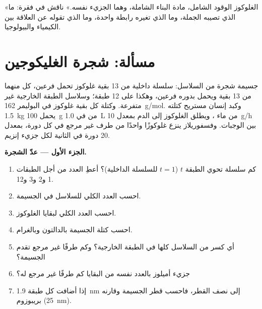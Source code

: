 \begin{exercise}[$\star\star\star$]\label{exo:b1:carbohydrates:12}
«الغلوكوز الوقود الشامل،  مادة البناء الشاملة، وهما
الجزيء نفسه.» ناقش في فقرة: ما الذي تصيبه الجملة، وما الذي تغيره
رابطة واحدة، وما الذي تقوله عن العلاقة بين الكيمياء والبيولوجيا.
\end{exercise}

\section{مسألة: شجرة الغليكوجين}

\begin{problem}
\label{pb:b1:carbohydrates:1}
جسيمة  شجرة من السلاسل: سلسلة داخلية من \qty{13}{} بقية
غلوكوز تحمل فرعين، كل منهما من \qty{13}{} بقية ويحمل بدوره فرعين،
وهكذا على \qty{12}{} طبقة؛ وسلاسل الطبقة الخارجية غير متفرعة. وكتلة
كل بقية غلوكوز في البوليمر \qty{162}{g/mol}. وكبد إنسان مستريح كتلته
\qty{1.5}{kg} يحمل \qty{100}{g} من  في \qty{1.0}{L} من ماء
، ويطلق الغلوكوز إلى الدم بمعدل \qty{10}{g/h} بين الوجبات.
وفسفوريلاز  ينزع غلوكوزًا واحدًا من طرف غير مرجع في كل
دورة، بمعدل \qty{20}{} دورة في الثانية لكل جزيء إنزيم.

\medskip
\noindent\textbf{الجزء الأول --- عدّ الشجرة.}
\begin{enumerate}
  \item كم سلسلة تحوي الطبقة $t$ ($t = 1$ للسلسلة الداخلية)؟ أعطِ
        العدد من أجل الطبقات 1 و2 و3 و12.
  \item احسب العدد الكلي للسلاسل في الجسيمة.
  \item احسب العدد الكلي لبقايا الغلوكوز.
  \item احسب كتلة الجسيمة بالدالتون وبالغرام.
  \item أي كسر من السلاسل كلها في الطبقة الخارجية؟ وكم طرفًا غير
        مرجع تقدم الجسيمة؟
  \item جزيء أميلوز بالعدد نفسه من البقايا كم طرفًا غير مرجع له؟
  \item إذا أضافت كل طبقة \qty{1.9}{nm} إلى نصف القطر، فاحسب قطر
        الجسيمة وقارنه بريبوزوم (\qty{25}{nm}).
\end{enumerate}


\end{problem}
